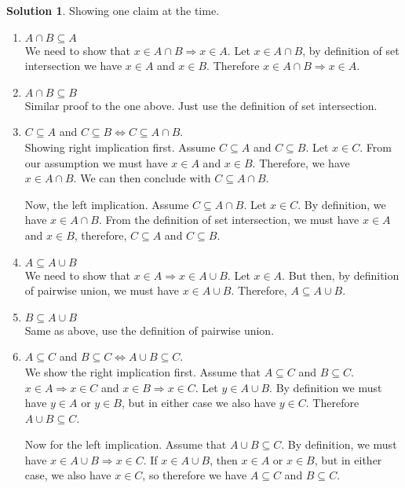 \documentclass[a4paper, twocolumn]{report}
\theoremstyle{definition}
\theoremstyle{solution}
\newtheorem*{sltn}{Solution}
\newcommand{\union}{\cup}
\newcommand{\intrsct}{\cap}
\begin{document}
\begin{sltn}
  Showing one claim at the time.
  \begin{enumerate}
    \item $A \intrsct B \subseteq A$ \\
      [0.2cm]
      We need to show that $x \in A \intrsct B \Rightarrow x \in A$.  Let $x
      \in A \intrsct B$, by definition of set intersection we have $x \in A$
      and $x \in B$. Therefore $x \in A \intrsct B \Rightarrow x \in A$.

    \item $A \intrsct B \subseteq B$ \\
      [0.2cm]
      Similar proof to the one above. Just use the definition of set
      intersection.

    \item $C \subseteq A$ and $ C \subseteq B \Longleftrightarrow C \subseteq A \intrsct B$.\\
      [0.2cm]
      Showing right implication first. Assume $C \subseteq A$ and $C \subseteq
      B$. Let $x \in C$.  From our assumption we must have $x \in A$ and $x \in
      B$. Therefore, we have $x \in A \intrsct B$.  We can then conclude with
      $C \subseteq A \intrsct B$. 

      Now, the left implication. Assume $C \subseteq A \intrsct B$. Let $x \in
      C$.  By definition, we have $x \in A \intrsct B$. From the definition of
      set intersection, we must have $x \in A$ and $x \in B$, therefore, $C
      \subseteq A$ and $C \subseteq B$. 

    \item $A \subseteq A \union B$ \\
      [0.2cm]
      We need to show that $x \in A \Rightarrow x \in A \union B$.  Let $x \in
      A$. But then, by definition of pairwise union, we must have $x \in A
      \union B$. Therefore, $A \subseteq A \union B$. 

    \item $B \subseteq A \union B$ \\
      [0.2cm]
      Same as above, use the definition of pairwise union.


    \item $A \subseteq C$ and $B \subseteq C \Longleftrightarrow A \union B \subseteq C$.\\
      [0.2cm]
      We show the right implication first. Assume that $A \subseteq C$ and $B
      \subseteq C$.  $x \in A \Rightarrow x \in C$ and $x \in B \Rightarrow x
      \in C$. Let $y \in A \union B$.  By definition we must have $y \in A$ or
      $y \in B$, but in either case we also have $y \in C$.  Therefore $A
      \union B \subseteq C$. 

      Now for the left implication. Assume that $A \union B \subseteq C$. By
      definition, we must have $x \in A \union B \Rightarrow x \in C$. If $x
      \in A \union B$, then $x \in A$ or $x \in B$, but in either case, we also
      have $x \in C$, so therefore we have $A \subseteq C$ and $B \subseteq C$.

  \end{enumerate}
\end{sltn}
\end{document}
